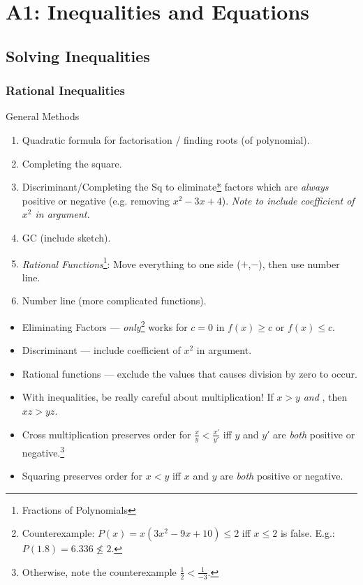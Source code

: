 \documentclass[oneside]{book}
\begin{document}


\chapter{A1: Inequalities and Equations}
\section{Solving Inequalities}
\subsection{Rational Inequalities}
\begin{stbox}{General Methods}
  \begin{enumerate}
    \item Quadratic formula for factorisation / finding roots (of polynomial).
    \item Completing the square.
    \item Discriminant/Completing the Sq to eliminate{\hyperlink{INEQGM3}{*}} factors which are \emph{always} positive or negative (e.g. removing \(x^2-3x+4\)). \emph{Note to include coefficient of \(x^2\) in argument.}
    \item GC (include sketch).
    \item \emph{Rational Functions}\footnote{Fractions of Polynomials}: Move everything to one side (\(+\),\(-\)), then use number line.
    \item Number line (more complicated functions).
\end{enumerate}
\end{stbox}
\begin{IN}
    \begin{itemize}[label=\footnotesize \(\square\) \normalsize]
        \item \hypertarget{INEQGM3}{Eliminating Factors --- \emph{only}\footnote{Counterexample: \(P(x)=x(3x^2-9x+10) \leq 2\) iff \(x \leq 2\) is false. E.g.: \(P(1.8)=6.336 \not\leq 2\).} works for \(c=0\) in \(f(x) \geq c\) or \(f(x) \leq c\).}
        \item Discriminant --- include coefficient of \(x^2\) in argument.
        \item Rational functions --- exclude the values that causes division by zero to occur.
        \item With inequalities, be really careful about multiplication! If \(x>y\) \emph{and} , then \(xz>yz\). 
        \item Cross multiplication preserves order for \(\frac{x}{y}<\frac{x'}{y'}\) iff \(y\) and \(y'\) are \emph{both} positive or negative.\footnote{Otherwise, note the counterexample \(\frac{1}{2}<\frac{1}{-3}\).}
        \item Squaring preserves order for \(x<y\) iff \(x\) and \(y\) are \emph{both} positive or negative.
    \end{itemize}
\end{IN}
\end{document}
